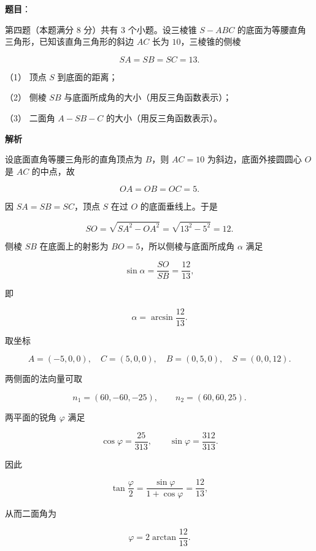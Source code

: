 \begin{answer}

\textbf{题目}：

第四题（本题满分 8 分）共有 3 个小题。设三棱锥 $S-ABC$ 的底面为等腰直角三角形，已知该直角三角形的斜边 $AC$ 长为 $10$，三棱锥的侧棱

\nopagebreak[4]
\[
SA=SB=SC=13.
\]

（1） 顶点 $S$ 到底面的距离；

（2） 侧棱 $SB$ 与底面所成角的大小（用反三角函数表示）；

（3） 二面角 $A-SB-C$ 的大小（用反三角函数表示）。
\nopagebreak[4]
\begin{center}\end{center}
\nopagebreak[4]
\textbf{解析}


设底面直角等腰三角形的直角顶点为 $B$，则 $AC=10$ 为斜边，底面外接圆圆心 $O$ 是 $AC$ 的中点，故

\nopagebreak[4]
\[
OA=OB=OC=5.
\]

因 $SA=SB=SC$，顶点 $S$ 在过 $O$ 的底面垂线上。于是

\nopagebreak[4]
\[
SO=\sqrt{SA^2-OA^2}
=\sqrt{13^2-5^2}=12.
\]


侧棱 $SB$ 在底面上的射影为 $BO=5$，所以侧棱与底面所成角 $\alpha$ 满足

\nopagebreak[4]
\[
\sin\alpha=\frac{SO}{SB}=\frac{12}{13},
\]

即

\nopagebreak[4]
\[
\alpha=\arcsin\frac{12}{13}.
\]


取坐标

\nopagebreak[4]
\[
A=(-5,0,0),\quad C=(5,0,0),\quad B=(0,5,0),\quad S=(0,0,12).
\]

两侧面的法向量可取

\nopagebreak[4]
\[
n_1=(60,-60,-25),\qquad n_2=(60,60,25).
\]

两平面的锐角 $\varphi$ 满足

\nopagebreak[4]
\[
\cos\varphi=\frac{25}{313},\qquad
\sin\varphi=\frac{312}{313}.
\]

因此

\nopagebreak[4]
\[
\tan\frac\varphi2
=\frac{\sin\varphi}{1+\cos\varphi}
=\frac{12}{13},
\]

从而二面角为

\nopagebreak[4]
\[
\varphi=2\arctan\frac{12}{13}.
\]




\end{answer}

